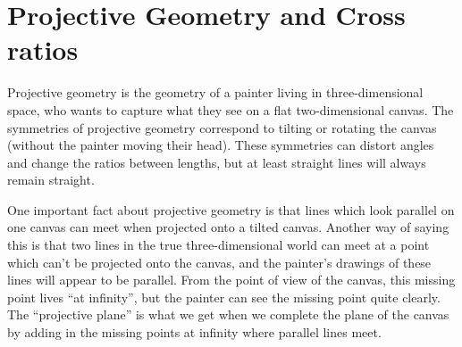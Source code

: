 \section{Projective Geometry and Cross ratios}

Projective geometry is the geometry of a painter living in three-dimensional space, who wants to capture what they see on a flat two-dimensional canvas. The symmetries of projective geometry correspond to tilting or rotating the canvas (without the painter moving their head). These symmetries can distort angles and change the ratios between lengths, but at least straight lines will always remain straight.

One important fact about projective geometry is that lines which look parallel on one canvas can meet when projected onto a tilted canvas. Another way of saying this is that two lines in the true three-dimensional world can meet at a point which can't be projected onto the canvas, and the painter's drawings of these lines will appear to be parallel. From the point of view of the canvas, this missing point lives ``at infinity'', but the painter can see the missing point quite clearly. The ``projective plane'' is what we get when we complete the plane of the canvas by adding in the missing points at infinity where parallel lines meet.

